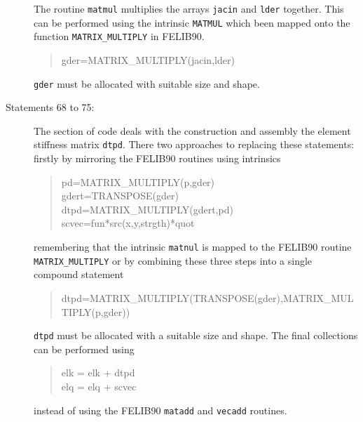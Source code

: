 \begin{description}
The routine {\tt matmul} multiplies the arrays {\tt jacin}
and {\tt lder} together. This can be performed using the
intrinsic {\tt MATMUL} which been mapped onto the function {\tt MATRIX\_MULTIPLY}
in FELIB90.
\begin{quote}
\source
gder=MATRIX\_MULTIPLY(jacin,lder)
\end{quote}
{\tt gder} must be allocated with suitable size and shape.
\item[Statements 68 to 75:] The section of code deals with the
construction and assembly the element stiffness matrix {\tt dtpd}. There
two approaches to replacing these statements: firstly by mirroring the FELIB90
routines using intrinsics
\begin{quote}
\source
pd=MATRIX\_MULTIPLY(p,gder)\\
gdert=TRANSPOSE(gder)\\
dtpd=MATRIX\_MULTIPLY(gdert,pd)\\
scvec=fun*src(x,y,strgth)*quot
\end{quote}
remembering that the intrinsic {\tt matnul} is mapped to the FELIB90
routine {\tt MATRIX\_MULTIPLY} or by combining these  three steps into a
single compound statement
\begin{quote}
\source
dtpd=MATRIX\_MULTIPLY(TRANSPOSE(gder),MATRIX\_MULTIPLY(p,gder))
\end{quote}
{\tt dtpd} must be allocated with a suitable size and shape.
The final collections can be performed using
\begin{quote}
\source
elk = elk + dtpd\\
elq = elq + scvec
\end{quote}
instead of using the FELIB90 {\tt matadd} and {\tt vecadd} routines.
\end{description}


